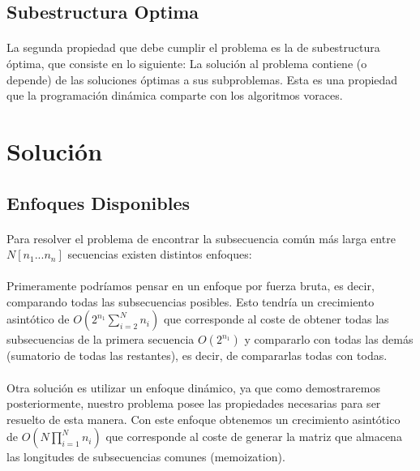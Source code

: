\documentclass{article}
\begin{document}
	\subsection{Subestructura Optima}
	
		\paragraph{}
		La segunda propiedad que debe cumplir el problema es la de subestructura óptima, que consiste en lo siguiente: La solución al problema contiene (o depende) de las soluciones óptimas a sus subproblemas. Esta es una propiedad que la programación dinámica comparte con los algoritmos voraces.

\section{Solución}

	\subsection{Enfoques Disponibles}
	
		\paragraph{}
		Para resolver el problema de encontrar la subsecuencia común más larga entre $N[n_{1}...n_{n}]$ secuencias existen distintos enfoques:

		\paragraph{}
		 Primeramente podríamos pensar en un enfoque por fuerza bruta, es decir, comparando todas las subsecuencias posibles. Esto tendría un crecimiento asintótico de $O(2^{n_{1}}\sum_{i = 2}^{N}n_{i})$ que corresponde al coste de obtener todas las subsecuencias de la primera secuencia $O(2^{n_{1}})$ y compararlo con todas las demás  (sumatorio de todas las restantes), es decir, de compararlas todas con todas.

		\paragraph{}
		 Otra solución es utilizar un enfoque dinámico, ya que como demostraremos posteriormente, nuestro problema posee las propiedades necesarias para ser resuelto de esta manera. Con este enfoque obtenemos un crecimiento asintótico de  $O(N\prod_{i = 1}^{N}n_{i})$ que corresponde al coste de generar la matriz que almacena las longitudes de subsecuencias comunes (memoization).
\end{document}
